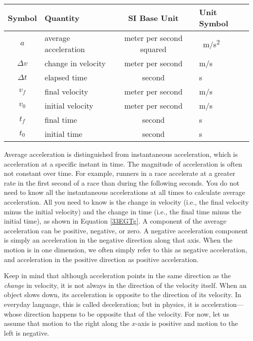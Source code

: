 \documentclass[main-physics.tex]{subfiles}
\begin{document}
\begin{center}
    \begin{tabular}{cl|cl}
    \hline
    \textbf{Symbol} & \textbf{Quantity} & \textbf{SI Base Unit} & \textbf{Unit Symbol}  \\
    \hline\hline
    \rule{0pt}{2.5ex}
        $a$ & average acceleration & meter per second squared & \SI{}{\meter/\second^2}\\
        $\Delta{v}$ & change in velocity & meter per second & m/s\\
        $\Delta{t}$ & elapsed time & second & s \\
    \hline
        $v_f$ & final velocity & meter per second & m/s\\
        $v_0$ & initial velocity & meter per second & m/s\\
        $t_f$ & final time & second & s \\    
        $t_0$ & initial time & second & s \\
        \hline
    \end{tabular}
    \captionsetup{type=figure,margin=1in,font=scriptsize}
\end{center}

Average acceleration is distinguished from \gls{instantaneous acceleration}, which is acceleration at a specific instant in time. The magnitude of acceleration is often not constant over time. For example, runners in a race accelerate at a greater rate in the first second of a race than during the following seconds. You do not need to know all the instantaneous accelerations at all times to calculate average acceleration. All you need to know is the change in velocity (i.e., the final velocity minus the initial velocity) and the change in time (i.e., the final time minus the initial time), as shown in Equation \eqref{33EGTg}. A component of the average acceleration can be positive, negative, or zero. A \gls{negative acceleration} component is simply an acceleration in the negative direction along that axis. When the motion is in one dimension, we often simply refer to this as negative acceleration, and acceleration in the positive direction as positive acceleration.

\vspace{1em}

Keep in mind that although acceleration points in the same direction as the \textit{change} in velocity, it is not always in the direction of the velocity itself. When an object slows down, its acceleration is opposite to the direction of its velocity. In everyday language, this is called deceleration; but in physics, it is acceleration---whose direction happens to be opposite that of the velocity. For now, let us assume that motion to the right along the $x$-axis is positive and motion to the left is negative.
\end{document}
